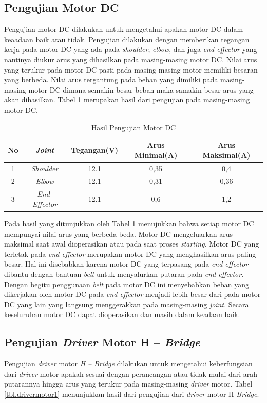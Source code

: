 \subsection{Pengujian Motor DC}
Pengujian motor DC dilakukan untuk mengetahui apakah motor DC dalam keaadaan baik atau tidak. Pengujian dilakukan dengan memberikan tegangan kerja pada motor DC yang ada pada \textit{shoulder}, \textit{elbow}, dan juga \textit{end-effector} yang nantinya diukur arus yang dihasilkan pada masing-masing motor DC. Nilai arus yang terukur pada motor DC pasti pada masing-masing motor memiliki besaran yang berbeda. Nilai arus tergantung pada beban yang dimiliki pada masing-masing motor DC dimana semakin besar beban maka samakin besar arus yang akan dihasilkan. Tabel \ref{tbl.motordc} merupakan hasil dari pengujian pada masing-masing motor DC.

\begin{table}[h]
	\centering
	\caption{Hasil Pengujian Motor DC}
	\label{tbl.motordc}
	\begin{tabular}{|c|c|c|c|c|}
		\hline
		\rowcolor[HTML]{9B9B9B} 
		No & \textit{Joint}        & Tegangan(V) & Arus Minimal(A) & Arus Maksimal(A)\\ \hline
		1  & \textit{Shoulder}     & 12.1        &   0,35       & 0,4 \\ \hline
		2  & \textit{Elbow}        & 12.1        &   0,31       & 0,36\\ \hline
		3  & \textit{End-Effector} & 12.1        &   0,6      & 1,2\\ \hline
	\end{tabular}
\end{table}

Pada hasil yang ditunjukkan oleh Tabel \ref{tbl.motordc} menujukkan bahwa setiap motor DC mempunyai nilai arus yang berbeda-beda. Motor DC mengeluarkan arus maksimal saat awal dioperasikan atau pada saat proses \textit{starting. }Motor DC yang terletak pada \textit{end-effcetor} merupakan motor DC yang menghasilkan arus paling besar. Hal ini disebabkan karena motor DC yang terpasang pada \textit{end-effector} dibantu dengan bantuan \textit{belt} untuk menyalurkan putaran pada\textit{ end-effector}. Dengan begitu penggunaan \textit{belt} pada motor DC ini menyebabkan beban yang dikerjakan oleh motor DC pada \textit{end-effector} menjadi lebih besar dari pada motor DC yang lain yang langsung menggerakkan pada masing-masing \textit{joint}. Secara keseluruhan motor DC dapat dioperasikan dan masih dalam keadaan baik.

\subsection{Pengujian \textit{Driver} Motor H – \textit{Bridge}}
Pengujian \textit{driver} motor\textit{ H –} \textit{Bridge} dilakukan untuk mengetahui keberfungsian dari \textit{driver} motor apakah sesuai dengan perancangan atau tidak mulai dari arah putarannya hingga arus yang terukur pada masing-masing \textit{driver} motor. Tabel \ref{tbl.drivermotor1} menunjukkan hasil dari pengujian dari \textit{driver} motor H-\textit{Bridge}. 

